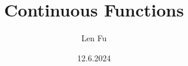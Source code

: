 \documentclass{article}
\title{Continuous Functions}
\author{Len Fu}
\date{12.6.2024}
\theoremstyle{definition}
\begin{document}
\maketitle
\begin{abstract}

\end{abstract}
\tableofcontents
\newpage
\end{document}
